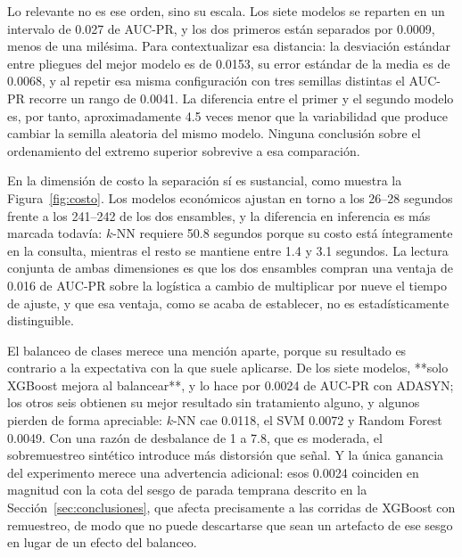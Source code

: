 \documentclass[pdflatex,sn-mathphys-num]{sn-jnl}
\begin{document}
Lo relevante no es ese orden, sino su escala. Los siete modelos se reparten en un intervalo de 0.027 de AUC-PR, y los dos primeros están separados por 0.0009, menos de una milésima. Para contextualizar esa distancia: la desviación estándar entre pliegues del mejor modelo es de 0.0153, su error estándar de la media es de 0.0068, y al repetir esa misma configuración con tres semillas distintas el AUC-PR recorre un rango de 0.0041. La diferencia entre el primer y el segundo modelo es, por tanto, aproximadamente 4.5 veces menor que la variabilidad que produce cambiar la semilla aleatoria del mismo modelo. Ninguna conclusión sobre el ordenamiento del extremo superior sobrevive a esa comparación.

En la dimensión de costo la separación sí es sustancial, como muestra la Figura~\ref{fig:costo}. Los modelos económicos ajustan en torno a los 26--28 segundos frente a los 241--242 de los dos ensambles, y la diferencia en inferencia es más marcada todavía: $k$-NN requiere 50.8 segundos porque su costo está íntegramente en la consulta, mientras el resto se mantiene entre 1.4 y 3.1 segundos. La lectura conjunta de ambas dimensiones es que los dos ensambles compran una ventaja de 0.016 de AUC-PR sobre la logística a cambio de multiplicar por nueve el tiempo de ajuste, y que esa ventaja, como se acaba de establecer, no es estadísticamente distinguible.

El balanceo de clases merece una mención aparte, porque su resultado es contrario a la expectativa con la que suele aplicarse. De los siete modelos, **solo XGBoost mejora al balancear**, y lo hace por 0.0024 de AUC-PR con ADASYN; los otros seis obtienen su mejor resultado sin tratamiento alguno, y algunos pierden de forma apreciable: $k$-NN cae 0.0118, el SVM 0.0072 y Random Forest 0.0049. Con una razón de desbalance de 1 a 7.8, que es moderada, el sobremuestreo sintético introduce más distorsión que señal. Y la única ganancia del experimento merece una advertencia adicional: esos 0.0024 coinciden en magnitud con la cota del sesgo de parada temprana descrito en la Sección~\ref{sec:conclusiones}, que afecta precisamente a las corridas de XGBoost con remuestreo, de modo que no puede descartarse que sean un artefacto de ese sesgo en lugar de un efecto del balanceo.
\end{document}
